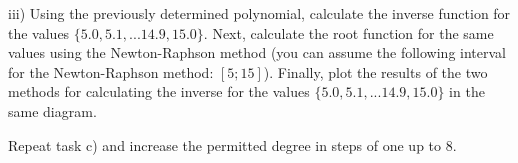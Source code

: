 \begin{aufgabe}
\begin{teilaufgabe}
\begin{teilaufgabe}
        \item[iii)] Using the previously determined polynomial, calculate the inverse function for the values $\{ 5.0, 5.1, ...14.9, 15.0 \}$. Next, calculate the root function for the same values using the Newton-Raphson method (you can assume the following interval for the Newton-Raphson method: $ [ 5; 15 ] $). Finally, plot the results of the two methods for calculating the inverse for the values $\{ 5.0, 5.1, ... 14.9, 15.0 \}$ in the same diagram.
    \end{teilaufgabe}
    \item Repeat task c) and increase the permitted degree in steps of one up to 8.
\end{teilaufgabe}


\end{aufgabe}
